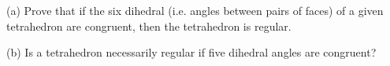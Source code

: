 (a) Prove that if the six dihedral (i.e. angles between pairs of faces) of a given tetrahedron are congruent, then the tetrahedron is regular.

(b) Is a tetrahedron necessarily regular if five dihedral angles are congruent?